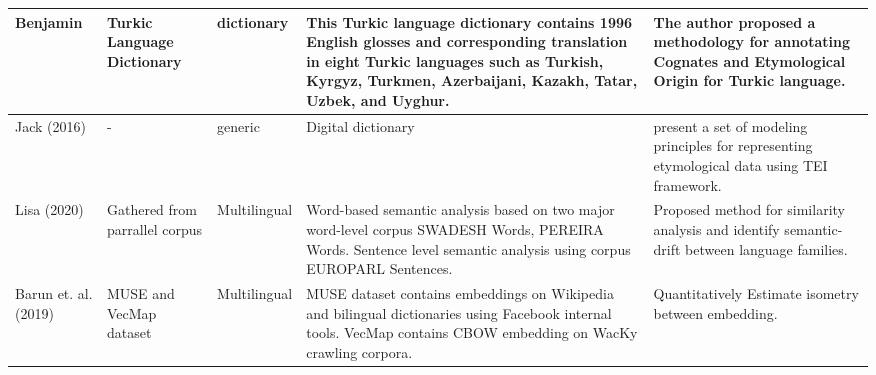 \begin{table}[htbp]
\begin{tabular}{|p{2cm}|p{2cm}|p{2cm}|p{4cm}|p{4cm}|}
        Benjamin \cite{mericli_annotating_2015}              & Turkic Language Dictionary                                                                                        & dictionary                                                                                    & This Turkic language dictionary contains 1996 English glosses and corresponding translation in eight Turkic languages such as  Turkish, Kyrgyz, Turkmen, Azerbaijani, Kazakh, Tatar,
        Uzbek, and Uyghur.                                   & The author proposed a methodology for annotating Cognates and Etymological Origin for Turkic language.                                                                                                                                                                                                                                                                                                                                                                                                                                           \\ \hline

        Jack (2016)~\cite{bowers_deep_2016}                  & -                                                                                                                 & generic                                                                                       & Digital dictionary                                                                                                                                                                   & present a set of modeling principles for representing etymological data using TEI framework.                                          \\ \hline


        Lisa (2020)~\cite{bowers_deep_2016}                  & Gathered from parrallel corpus                                                                                    & Multilingual                                                                                  & Word-based semantic analysis based on two major word-level corpus SWADESH Words, PEREIRA Words. Sentence level semantic analysis using corpus EUROPARL Sentences.                    & Proposed method for similarity analysis and identify semantic-drift between language families.                                        \\ \hline

        Barun et. al. (2019)~\cite{patra_bilingual_2019}     & MUSE and VecMap dataset                                                                                           & Multilingual                                                                                  & MUSE dataset contains embeddings on Wikipedia and bilingual dictionaries using Facebook internal tools. VecMap contains CBOW embedding on WacKy crawling corpora.                    & Quantitatively Estimate isometry between embedding.                                                                                   \\ \hline



\end{tabular}
\end{table}
